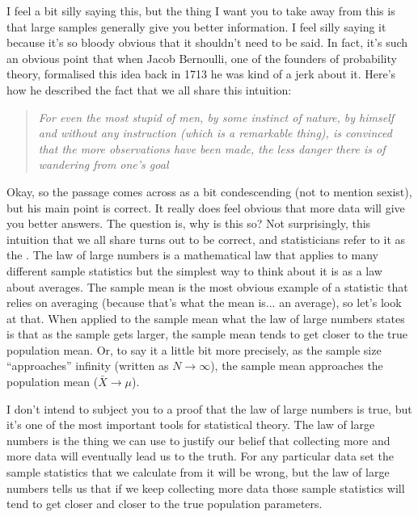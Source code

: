 I feel a bit silly saying this, but the thing I want you to take away from this is that large samples generally give you better information. I feel silly saying it because it's so bloody obvious that it shouldn't need to be said. In fact, it's such an obvious point that when Jacob Bernoulli, one of the founders of probability theory, formalised this idea back in 1713 he was kind of a jerk about it. Here's how he described the fact that we all share this intuition:
\begin{quote}
{\it For even the most stupid of men, by some instinct of nature, by himself and without any instruction (which is a remarkable thing), is convinced that the more observations have been made, the less danger there is of wandering from one's goal} \parencite[see][p65]{Stigler1986}
\end{quote}
Okay, so the passage comes across as a bit condescending (not to mention sexist), but his main point is correct. It really does feel obvious that more data will give you better answers. The question is, why is this so? Not surprisingly, this intuition that we all share turns out to be correct, and statisticians refer to it as the . The law of large numbers is a mathematical law that applies to many different sample statistics but the simplest way to think about it is as a law about averages. The sample mean is the most obvious example of a statistic that relies on averaging (because that's what the mean is... an average), so let's look at that. When applied to the sample mean what the law of large numbers states is that as the sample gets larger, the sample mean tends to get closer to the true population mean. Or, to say it a little bit more precisely, as the sample size ``approaches'' infinity (written as $N \rightarrow \infty$), the sample mean approaches the population mean ($\bar{X} \rightarrow \mu$). 

I don't intend to subject you to a proof that the law of large numbers is true, but it's one of the most important tools for statistical theory. The law of large numbers is the thing we can use to justify our belief that collecting more and more data will eventually lead us to the truth. For any particular data set the sample statistics that we calculate from it will be wrong, but the law of large numbers tells us that if we keep collecting more data those sample statistics will tend to get closer and closer to the true population parameters.


